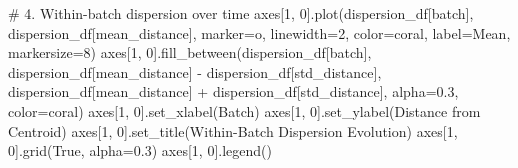 \documentclass[
  letterpaper,
  DIV=11,
  numbers=noendperiod]{scrartcl}
\newenvironment{Shaded}{\begin{snugshade}}{\end{snugshade}}
\newcommand{\CommentTok}[1]{\textcolor[rgb]{0.37,0.37,0.37}{#1}}
\newcommand{\DecValTok}[1]{\textcolor[rgb]{0.68,0.00,0.00}{#1}}
\newcommand{\FloatTok}[1]{\textcolor[rgb]{0.68,0.00,0.00}{#1}}
\newcommand{\NormalTok}[1]{\textcolor[rgb]{0.00,0.23,0.31}{#1}}
\newcommand{\OperatorTok}[1]{\textcolor[rgb]{0.37,0.37,0.37}{#1}}
\newcommand{\StringTok}[1]{\textcolor[rgb]{0.13,0.47,0.30}{#1}}
\newcommand{\VariableTok}[1]{\textcolor[rgb]{0.07,0.07,0.07}{#1}}
\renewenvironment{Shaded}{%
  \begin{tcolorbox}[%
    enhanced,%
    colback=codebg,%
    colframe=codebg,%
    borderline west={3pt}{0pt}{sectionblue},%
    fontupper=\small\ttfamily,%
    boxrule=0pt,%
    arc=0pt,%
    boxsep=5pt,%
    left=2mm,%
    right=2mm,%
    top=2mm,%
    bottom=2mm%
  ]%
}{%
  \end{tcolorbox}%
}
\begin{document}
\begin{Shaded}
\begin{Highlighting}[]
\CommentTok{\# 4. Within{-}batch dispersion over time}
\NormalTok{axes[}\DecValTok{1}\NormalTok{, }\DecValTok{0}\NormalTok{].plot(dispersion\_df[}\StringTok{\textquotesingle{}batch\textquotesingle{}}\NormalTok{], dispersion\_df[}\StringTok{\textquotesingle{}mean\_distance\textquotesingle{}}\NormalTok{], }
\NormalTok{               marker}\OperatorTok{=}\StringTok{\textquotesingle{}o\textquotesingle{}}\NormalTok{, linewidth}\OperatorTok{=}\DecValTok{2}\NormalTok{, color}\OperatorTok{=}\StringTok{\textquotesingle{}coral\textquotesingle{}}\NormalTok{, label}\OperatorTok{=}\StringTok{\textquotesingle{}Mean\textquotesingle{}}\NormalTok{, markersize}\OperatorTok{=}\DecValTok{8}\NormalTok{)}
\NormalTok{axes[}\DecValTok{1}\NormalTok{, }\DecValTok{0}\NormalTok{].fill\_between(dispersion\_df[}\StringTok{\textquotesingle{}batch\textquotesingle{}}\NormalTok{], }
\NormalTok{                        dispersion\_df[}\StringTok{\textquotesingle{}mean\_distance\textquotesingle{}}\NormalTok{] }\OperatorTok{{-}}\NormalTok{ dispersion\_df[}\StringTok{\textquotesingle{}std\_distance\textquotesingle{}}\NormalTok{],}
\NormalTok{                        dispersion\_df[}\StringTok{\textquotesingle{}mean\_distance\textquotesingle{}}\NormalTok{] }\OperatorTok{+}\NormalTok{ dispersion\_df[}\StringTok{\textquotesingle{}std\_distance\textquotesingle{}}\NormalTok{],}
\NormalTok{                        alpha}\OperatorTok{=}\FloatTok{0.3}\NormalTok{, color}\OperatorTok{=}\StringTok{\textquotesingle{}coral\textquotesingle{}}\NormalTok{)}
\NormalTok{axes[}\DecValTok{1}\NormalTok{, }\DecValTok{0}\NormalTok{].set\_xlabel(}\StringTok{\textquotesingle{}Batch\textquotesingle{}}\NormalTok{)}
\NormalTok{axes[}\DecValTok{1}\NormalTok{, }\DecValTok{0}\NormalTok{].set\_ylabel(}\StringTok{\textquotesingle{}Distance from Centroid\textquotesingle{}}\NormalTok{)}
\NormalTok{axes[}\DecValTok{1}\NormalTok{, }\DecValTok{0}\NormalTok{].set\_title(}\StringTok{\textquotesingle{}Within{-}Batch Dispersion Evolution\textquotesingle{}}\NormalTok{)}
\NormalTok{axes[}\DecValTok{1}\NormalTok{, }\DecValTok{0}\NormalTok{].grid(}\VariableTok{True}\NormalTok{, alpha}\OperatorTok{=}\FloatTok{0.3}\NormalTok{)}
\NormalTok{axes[}\DecValTok{1}\NormalTok{, }\DecValTok{0}\NormalTok{].legend()}


\end{Highlighting}
\end{Shaded}
\end{document}
